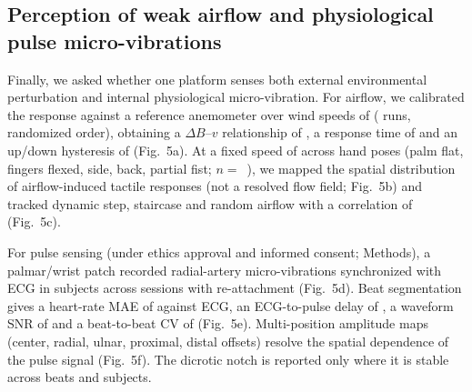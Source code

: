 \subsection*{Perception of weak airflow and physiological pulse micro-vibrations}
Finally, we asked whether one platform senses both external environmental
perturbation and internal physiological micro-vibration. For airflow, we
calibrated the response against a reference anemometer over wind speeds of
( runs, randomized order), obtaining a
$\Delta B$--$v$ relationship of , a response
time of  and an up/down hysteresis of
 (Fig.~5a). At a fixed speed of
 across hand poses (palm flat, fingers
flexed, side, back, partial fist; $n=$~), we mapped the
spatial distribution of airflow-induced tactile responses (not a resolved
flow field; Fig.~5b) and tracked dynamic step, staircase and random airflow
with a correlation of  (Fig.~5c).

For pulse sensing (under ethics approval and informed consent; Methods), a
palmar/wrist patch recorded radial-artery micro-vibrations synchronized with
ECG in  subjects across
 sessions with re-attachment (Fig.~5d).
Beat segmentation gives a heart-rate MAE of  against
ECG, an ECG-to-pulse delay of , a
waveform SNR of  and a beat-to-beat CV of
 (Fig.~5e). Multi-position amplitude maps (center,
radial, ulnar, proximal, distal offsets) resolve the spatial dependence of
the pulse signal (Fig.~5f). The dicrotic notch is reported only where it is
stable across beats and subjects.
